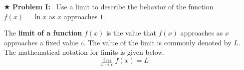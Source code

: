 \documentclass[handout]{ximera}  %
\begin{document}
\begin{itemize}
    
    \vspace{0.2in} \item[$\bigstar$] \textbf{Problem I:} \ Use a limit
    to describe the behavior of the function $f(x)=\ln x$ as $x$
    approaches $1.$




    \begin{definition}
    The \textbf{limit of a function} $f(x)$ is the value that $f(x)$
    approaches as $x$ approaches a fixed value $c.$  The value of
    the limit is commonly denoted by $L$.  The mathematical notation
    for limits is given below.
    \[ \lim_{x \rightarrow c} f(x) = L  \] 
      \end{definition}

\end{itemize}
\end{document}
